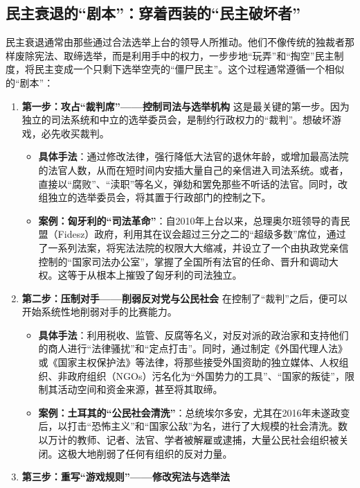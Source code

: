 \subsection{民主衰退的“剧本”：穿着西装的“民主破坏者”}

民主衰退通常由那些通过合法选举上台的领导人所推动。他们不像传统的独裁者那样废除宪法、取缔选举，而是利用手中的权力，一步步地“玩弄”和“掏空”民主制度，将民主变成一个只剩下选举空壳的“僵尸民主”。这个过程通常遵循一个相似的“剧本”：

\begin{enumerate}
    \item \textbf{第一步：攻占“裁判席”——控制司法与选举机构}
    这是最关键的第一步。因为独立的司法系统和中立的选举委员会，是制约行政权力的“裁判”。想破坏游戏，必先收买裁判。
    \begin{itemize}
        \item \textbf{具体手法}：通过修改法律，强行降低大法官的退休年龄，或增加最高法院的法官人数，从而在短时间内安插大量自己的亲信进入司法系统。或者，直接以“腐败”、“渎职”等名义，弹劾和罢免那些不听话的法官。同时，改组独立的选举委员会，将其置于行政部门的控制之下。
        \item \textbf{案例：匈牙利的“司法革命”}：自2010年上台以来，总理奥尔班领导的青民盟（Fidesz）政府，利用其在议会超过三分之二的“超级多数”席位，通过了一系列法案，将宪法法院的权限大大缩减，并设立了一个由执政党亲信控制的“国家司法办公室”，掌握了全国所有法官的任命、晋升和调动大权。这等于从根本上摧毁了匈牙利的司法独立。
    \end{itemize}
    \item \textbf{第二步：压制对手——削弱反对党与公民社会}
    在控制了“裁判”之后，便可以开始系统性地削弱对手的比赛能力。
    \begin{itemize}
        \item \textbf{具体手法}：利用税收、监管、反腐等名义，对反对派的政治家和支持他们的商人进行“法律骚扰”和“定点打击”。同时，通过制定《外国代理人法》或《国家主权保护法》等法律，将那些接受外国资助的独立媒体、人权组织、非政府组织（NGOs）污名化为“外国势力的工具”、“国家的叛徒”，限制其活动空间和资金来源，甚至将其取缔。
        \item \textbf{案例：土耳其的“公民社会清洗”}：总统埃尔多安，尤其在2016年未遂政变后，以打击“恐怖主义”和“国家公敌”为名，进行了大规模的社会清洗。数以万计的教师、记者、法官、学者被解雇或逮捕，大量公民社会组织被关闭。这极大地削弱了任何有组织的反对力量。
    \end{itemize}
    \item \textbf{第三步：重写“游戏规则”——修改宪法与选举法}

\end{enumerate}
